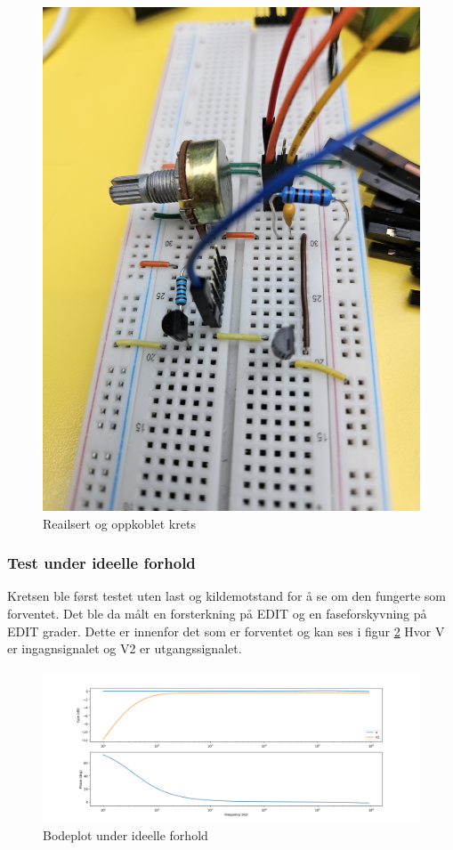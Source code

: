 \begin{figure}[H]
\centering
\includegraphics[scale=0.1]{bilder/Oppkobling.jpg}
\caption{Reailsert og oppkoblet krets}
\label{fig:Oppkobling}
\end{figure}


\subsubsection{Test under ideelle forhold}

Kretsen ble først testet uten last og kildemotstand for å se om den fungerte som forventet. Det ble da målt en forsterkning på EDIT og en faseforskyvning på EDIT grader. Dette er innenfor det som er forventet og kan ses i figur \ref{fig:Bodeplot+Pase_First} Hvor V er ingagnsignalet og V2 er utgangssignalet.

\begin{figure}[H]
\centering
\includegraphics[scale=0.4]{bilder/Bodeplot+Pase_First.png}
\caption{Bodeplot under ideelle forhold}
\label{fig:Bodeplot+Pase_First}
\end{figure}


